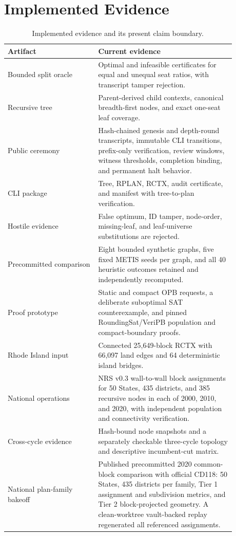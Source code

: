 \section{Implemented Evidence}

\begin{table}[h]
\centering
\begin{tabular}{p{0.35\linewidth}p{0.53\linewidth}}
\toprule
Artifact & Current evidence \\
\midrule
Bounded split oracle & Optimal and infeasible certificates for equal and
unequal seat ratios, with transcript tamper rejection. \\
Recursive tree & Parent-derived child contexts, canonical breadth-first nodes,
and exact one-seat leaf coverage. \\
Public ceremony & Hash-chained genesis and depth-round transcripts, immutable
CLI transitions, prefix-only verification, review windows, witness thresholds,
completion binding, and permanent halt behavior. \\
CLI package & Tree, RPLAN, RCTX, audit certificate, and manifest with
tree-to-plan verification. \\
Hostile evidence & False optimum, ID tamper, node-order, missing-leaf, and
leaf-universe substitutions are rejected. \\
Precommitted comparison & Eight bounded synthetic graphs, five fixed METIS
seeds per graph, and all 40 heuristic outcomes retained and independently
recomputed. \\
Proof prototype & Static and compact OPB requests, a deliberate suboptimal SAT
counterexample, and pinned RoundingSat/VeriPB population and compact-boundary
proofs. \\
Rhode Island input & Connected 25,649-block RCTX with 66,097 land edges and 64
deterministic island bridges. \\
National operations & NRS v0.3 wall-to-wall block assignments for 50 States,
435 districts, and 385 recursive nodes in each of 2000, 2010, and 2020, with
independent population and connectivity verification. \\
Cross-cycle evidence & Hash-bound node snapshots and a separately checkable
three-cycle topology and descriptive incumbent-cut matrix. \\
National plan-family bakeoff & Published precommitted 2020 common-block
comparison with official CD118: 50 States, 435 districts per family, Tier 1
assignment and subdivision metrics, and Tier 2 block-projected geometry. A
clean-worktree vault-backed replay regenerated all referenced assignments. \\
\bottomrule
\end{tabular}
\caption{Implemented evidence and its present claim boundary.}
\end{table}

